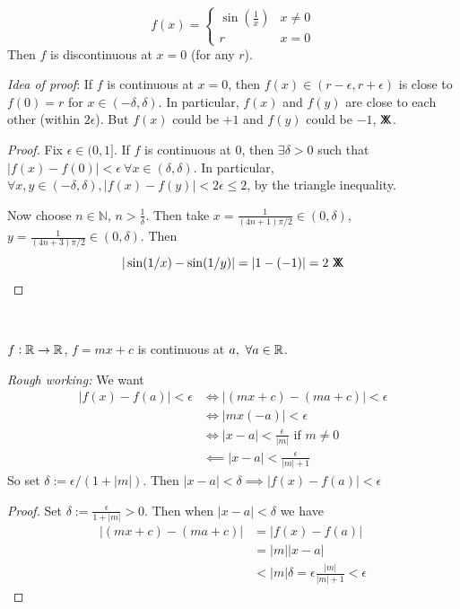 \begin{example}
\[f(x) = \begin{cases}
 \sin(\frac{1}{x}) & x \neq 0\\
 r & x = 0	
 \end{cases}
\] Then $f$ is discontinuous at $x = 0$ (for any $r$).	

\begin{center}
\end{center}

\emph{Idea of proof}: If $f$ is continuous at $x = 0$, then $f(x) \in (r-\epsilon, r + \epsilon)$ is close to $f(0) = r$ for $x \in (- \delta, \delta).$ In particular, $f(x)$ and $f(y)$ are close to each other (within $2\epsilon$). But $f(x)$ could be $+1$ and $f(y)$ could be $-1$, $\mathsf{X}\mkern-8.5mu\mathsf{X}$.
\begin{proof}
Fix $\epsilon \in (0,1]$. If $f$ is continuous at $0$, then $\exists \delta > 0$ such that $|f(x) - f(0)| < \epsilon~\forall x \in (\delta,\delta)$. In particular, $\forall x,y \in (-\delta, \delta), |f(x) - f(y)| < 2\epsilon \leq 2$, by the triangle inequality. 

Now choose $n \in \mathbb{N}$, $n > \frac{1}{\delta}$. Then take $x = \frac{1}{(4n+1)\pi/2} \in (0,\delta)$, $y = \frac{1}{(4n+3)\pi/2} \in (0,\delta)$. Then 
\[|\sin(1/x) - \sin(1/y)| = |1 - (-1)| = 2 ~\mathsf{X}\mkern-8.5mu\mathsf{X}\qedhere\]
\end{proof}

\end{example}~


\begin{example}
$f: \mathbb{R} \to \mathbb{R}$, $f = mx + c$ is continuous at $a, ~\forall a \in\mathbb{R}$. 

\emph{Rough working:} We want 
\[\begin{aligned}|f(x) - f(a)| < \epsilon &\iff |(mx+c) - (ma + c)|  < \epsilon \\
&\iff |mx(-a)| < \epsilon\\
&\iff |x-a| < \frac{\epsilon}{|m|} \text{ if } m \neq 0 \\
&\impliedby |x-a| < \frac{\epsilon}{|m|+1} 
\end{aligned}
\]
So set $\delta:= \epsilon / (1 + |m|)$. Then $|x-a| < \delta \implies |f(x) - f(a)| < \epsilon$
\begin{proof}
Set $\delta:= \frac{\epsilon }{1 + |m|} > 0$. Then when $|x-a| < \delta$ we have  
\[\begin{aligned}
|(mx+ c) - (ma +c)| &= |f(x) - f(a)| \\
&= |m||x-a| \\
&< |m|\delta = \epsilon \frac{|m|}{|m|+1} < \epsilon	
\end{aligned}\]
\end{proof}
\end{example}

